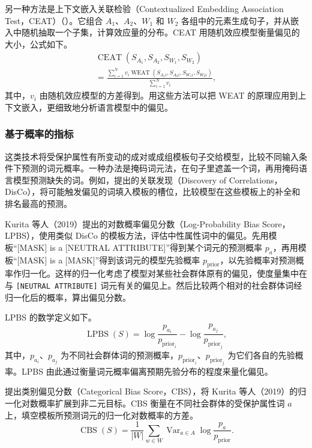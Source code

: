 另一种方法是上下文嵌入关联检验（Contextualized Embedding Association Test，CEAT）（）。它组合 $A_1$、$A_2$、$W_1$ 和 $W_2$ 各组中的元素生成句子，并从嵌入中随机抽取一个子集，计算效应量的分布。CEAT 用随机效应模型衡量偏见的大小，公式如下。
\begin{multline}
\operatorname{CEAT}(S_{A_1},S_{A_2},S_{W_1},S_{W_2})\\
=\frac{\sum_{i=1}^{N}v_i\operatorname{WEAT}(S_{A_1i},S_{A_2i},S_{W_1i},S_{W_2i})}
{\sum_{i=1}^{N}v_i},
\label{eq:ch06-ceat}
\end{multline}
其中，$v_i$ 由随机效应模型的方差得到。用这些方法可以把 WEAT 的原理应用到上下文嵌入，更细致地分析语言模型中的偏见。

\subsubsection{基于概率的指标}
这类技术将受保护属性有所变动的成对或成组模板句子交给模型，比较不同输入条件下预测的词元概率。一种办法是掩码词元法，在句子里遮盖一个词，再用掩码语言模型预测缺失的词。例如，提出的关联发现（Discovery of Correlations，DisCo），将可能触发偏见的词填入模板的槽位，比较模型在这些模板上的补全和排名最高的预测。

Kurita 等人（2019）提出的对数概率偏见分数（Log-Probability Bias Score，LPBS），使用类似 DisCo 的模板方法，评估中性属性词中的偏见。先用模板“[MASK] is a [NEUTRAL ATTRIBUTE]”得到某个词元的预测概率 $p_a$，再用模板“[MASK] is a [MASK]”得到该词元的模型先验概率 $p_{\mathrm{prior}}$，以先验概率对预测概率作归一化。这样的归一化考虑了模型对某些社会群体原有的偏见，使度量集中在与 \texttt{[NEUTRAL ATTRIBUTE]} 词元有关的偏见上。然后比较两个相对的社会群体词经归一化后的概率，算出偏见分数。

LPBS 的数学定义如下。
\begin{equation}
\operatorname{LPBS}(S)
=\log\frac{p_{a_i}}{p_{\mathrm{prior}_i}}
 -\log\frac{p_{a_j}}{p_{\mathrm{prior}_j}},
\label{eq:ch06-lpbs}
\end{equation}
其中，$p_{a_i}$、$p_{a_j}$ 为不同社会群体词的预测概率，$p_{\mathrm{prior}_i}$、$p_{\mathrm{prior}_j}$ 为它们各自的先验概率。LPBS 由此通过衡量词元概率偏离预期先验分布的程度来量化偏见。

提出类别偏见分数（Categorical Bias Score，CBS），将 Kurita 等人（2019）的归一化对数概率扩展到非二元目标。CBS 衡量在不同社会群体的受保护属性词 $a$ 上，填空模板所预测词元的归一化对数概率的方差。
\begin{equation}
\operatorname{CBS}(S)
=\frac{1}{|W|}\sum_{w\in W}\operatorname{Var}_{a\in A}\log\frac{p_a}{p_{\mathrm{prior}}}.
\label{eq:ch06-cbs}
\end{equation}

